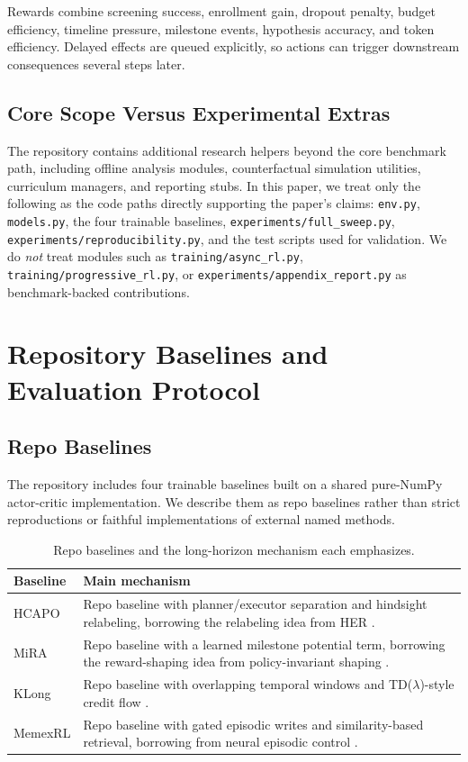 \documentclass{article}
\begin{document}
Rewards combine screening success, enrollment gain, dropout penalty, budget efficiency, timeline pressure, milestone events, hypothesis accuracy, and token efficiency. Delayed effects are queued explicitly, so actions can trigger downstream consequences several steps later.

\subsection{Core Scope Versus Experimental Extras}

The repository contains additional research helpers beyond the core benchmark path, including offline analysis modules, counterfactual simulation utilities, curriculum managers, and reporting stubs. In this paper, we treat only the following as the code paths directly supporting the paper's claims: \texttt{env.py}, \texttt{models.py}, the four trainable baselines, \texttt{experiments/full\_sweep.py}, \texttt{experiments/reproducibility.py}, and the test scripts used for validation. We do \emph{not} treat modules such as \texttt{training/async\_rl.py}, \texttt{training/progressive\_rl.py}, or \texttt{experiments/appendix\_report.py} as benchmark-backed contributions.

\section{Repository Baselines and Evaluation Protocol}

\subsection{Repo Baselines}

The repository includes four trainable baselines built on a shared pure-NumPy actor-critic implementation. We describe them as repo baselines rather than strict reproductions or faithful implementations of external named methods.

\begin{table}[t]
  \centering
  \caption{Repo baselines and the long-horizon mechanism each emphasizes.}
  \label{tab:baselines}
  \begin{tabularx}{\linewidth}{lX}
    \toprule
    Baseline & Main mechanism \\
    \midrule
    HCAPO & Repo baseline with planner/executor separation and hindsight relabeling, borrowing the relabeling idea from HER \citep{andrychowicz2017hindsight}. \\
    MiRA & Repo baseline with a learned milestone potential term, borrowing the reward-shaping idea from policy-invariant shaping \citep{ng1999policy}. \\
    KLong & Repo baseline with overlapping temporal windows and TD($\lambda$)-style credit flow \citep{sutton2018}. \\
    MemexRL & Repo baseline with gated episodic writes and similarity-based retrieval, borrowing from neural episodic control \citep{pritzel2017}. \\
    \bottomrule
  \end{tabularx}
\end{table}
\end{document}
